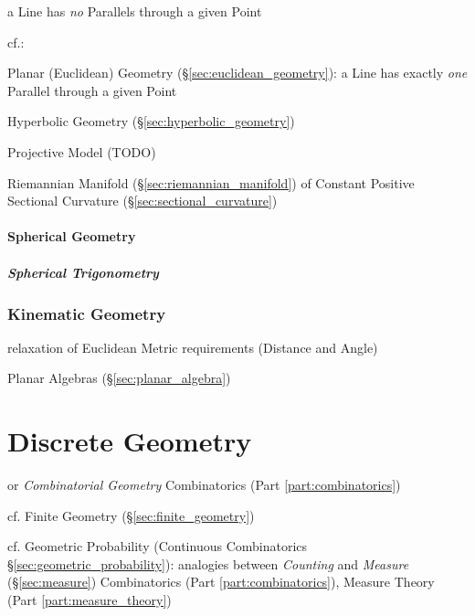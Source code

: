 a Line has \emph{no} Parallels through a given Point

cf.:

\fist Planar (Euclidean) Geometry (\S\ref{sec:euclidean_geometry}): a Line has
exactly \emph{one} Parallel through a given Point

\fist Hyperbolic Geometry (\S\ref{sec:hyperbolic_geometry})

Projective Model (TODO)

Riemannian Manifold (\S\ref{sec:riemannian_manifold}) of Constant Positive
Sectional Curvature (\S\ref{sec:sectional_curvature})



\paragraph{Spherical Geometry}\label{sec:spherical_geometry}\hfill

\subparagraph{Spherical Trigonometry}\label{sec:spherical_trigonometry}\hfill



\subsubsection{Kinematic Geometry}\label{sec:kinematic_geometry}\hfill

relaxation of Euclidean Metric requirements (Distance and Angle)

Planar Algebras (\S\ref{sec:planar_algebra})




\section{Discrete Geometry}\label{sec:discrete_geometry}

or \emph{Combinatorial Geometry} \fist Combinatorics (Part
\ref{part:combinatorics})

cf. Finite Geometry (\S\ref{sec:finite_geometry})

\fist cf. Geometric Probability (Continuous Combinatorics
\S\ref{sec:geometric_probability}): analogies between \emph{Counting} and
\emph{Measure} (\S\ref{sec:measure}) \fist Combinatorics (Part
\ref{part:combinatorics}), Measure Theory (Part \ref{part:measure_theory})



